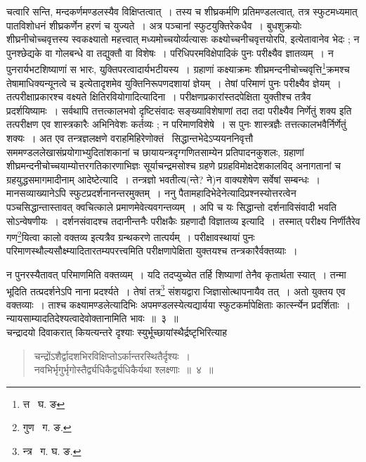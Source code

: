 \documentclass[11pt, openany]{book}
\begin{document}
\noindent चत्वारि सन्ति, मन्दकर्णमण्डलस्यैव विक्षिप्तत्वात्~। तस्य च शीघ्रकर्मणि प्रतिमण्डलत्वात्, तत्र स्फुटमध्यमात् 
पातविशोधनं शीघ्रकर्णेन हरणं च युज्यते~। अत्र पञ्चानां स्फुटयुक्तिरेकधैव~। बुधशुक्रयोः शीघ्रनीचोच्चवृत्तस्य स्वकक्ष्यातो महत्त्वात् 
मध्यमोच्चयोर्व्यत्यासः कक्ष्योच्चनीचवृत्तयोरपि, इत्येतावानेव भेदः ; न पुनश्छेद्यके वा गोलबन्धे वा तद्युक्तौ वा विशेषः~। परिधिपरमविक्षेपादिकं पुनः परीक्ष्यैव ज्ञातव्यम्~। न पुनरार्यभटशिष्याणां स भारः, युक्तिपरत्वादार्यभटीयस्य~। 
ग्रहाणां कक्ष्याक्रमः शीघ्रमन्दनीचोच्चवृत्ति\renewcommand{\thefootnote}{१}\footnote{ त्त \textendash\ घ. ङ}क्रमश्च 
तेषामाधिक्यन्यूनत्वे च इत्येतादृशमेव युक्तिनिरूपणदशायां ज्ञेयम्~। तेषां परिमाणं पुनः परीक्ष्यैव ज्ञेयम्~। तत्परीक्षाप्रकारश्च वक्ष्यते {\qt क्षितिरवियोगादि}त्यादिना~। परीक्षणप्रकारांस्तदपेक्षिता युक्तीश्च तत्रैव प्रदर्शयिष्यामः~। सर्वथापि तत्तत्कालभवो दृष्टिसंवादः सङ्ख्याविशेषाणां तदा तदा परीक्ष्यैव निर्णेतुं शक्य इति तत्परीक्षण एव शास्त्रकारैः अभिनिवेशः कर्तव्यः ; न परिमाणविशेषे~। स पुनः शास्त्रज्ञैः 
तत्तत्कालभवैर्निर्णेतुं शक्यः~। अत एव तन्त्रज्ञलक्षणे वराहमिहिरेणोक्तं \textendash\ {\qt सिद्धान्तभेदेऽप्ययननिवृत्तौ 
सममण्डललेखासंप्रयोगाभ्युदितांशकानां च छायायन्त्रदृग्गणितसाम्येन प्रतिपादनकुशलः, ग्रहाणां शीघ्रमन्दनीचोच्चयाम्योत्तरगतिकारणाभिज्ञः सूर्याचन्द्रमसोश्च ग्रहणे प्रग्रहविमोक्षदेशकालविद् अनागतानां च ग्रहयुद्धसमागमादीनाम् आदेष्टे}त्यादि~। {\qt तन्त्रज्ञो 
भवती}त्य(न्ते? ने)न वाक्यशेषेण सर्वेषां सम्बन्धः~। मानसव्याख्यानेऽपि स्फुटप्रदर्शनानन्तरमुक्तम्~। ननु 
पैतामहादिभेदेनेत्यादिप्रश्नस्योत्तरत्वेन पञ्चसिद्धान्तास्तावत् क्वचित्काले प्रमाणमेवेत्यवगन्तव्यम्~। अपि च यः सिद्धान्तो 
दर्शनाविसंवादी भवति सोऽन्वेषणीयः~। दर्शनसंवादश्च तदानीन्तनैः परीक्षकैः ग्रहणादौ विज्ञातव्य इत्यादि~। तस्मात् परीक्ष्य 
निर्णीतैरेव गण\renewcommand{\thefootnote}{२}\footnote{गुण \textendash\ ग. ङ.}यित्वा कालो वक्तव्य इत्यत्रैव ग्रन्थकरणे तात्पर्यम्~। परीक्षावस्थायां पुनः परिमाणस्थौल्यसौक्ष्म्यादितारतम्यपरत्त्वमिति परीक्षणापेक्षिता युक्तयश्च तन्त्रकारैर्वक्तव्याः~। 

\newpage

\noindent न पुनरस्यैतावत् परिमाणमिति वक्तव्यम्~। यदि तदप्युच्येत तर्हि शिष्याणां तेनैव कृतार्थता स्यात्~। तन्मा भूदिति तत्प्रदर्शनेऽपि नाना प्रदर्श्यते~। तेषां तत्र\renewcommand{\thefootnote}{१}\footnote{न्त्र \textendash\ ग. घ. ङ.}
संशयद्वारा जिज्ञासोत्थापनायैव तत्~। अतो युक्तय एव वक्तव्याः~। ताश्च {\qt कक्ष्यामण्डले}त्यादिभिः {\qt अपमण्डलस्ये}त्यद्यार्यया  
स्फुटकर्मापेक्षिताः कार्त्स्न्येन प्रदर्शिताः~। न्यायसाम्यादतिदेश्यत्वादेवोक्तानामिति भावः~॥~३~॥ \\

\indent चन्द्रादयो दिवाकरात् कियत्यन्तरे दृश्याः स्युर्भूच्छायांस्थैर्द्रष्टृभिरित्याह\textendash 
\begin{quote}
{\ab चन्द्रोंऽशैर्द्वादशभिरविक्षिप्तोऽर्कान्तरस्थितैर्दृश्यः~। \\
नवभिर्भृगुर्भृगोस्तैर्द्व्यधिकैर्द्व्यधिकैर्यथा श्लक्ष्णाः~॥~४~॥} 
\end{quote}
\end{document}
